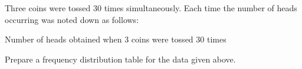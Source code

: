 Three coins were tossed 30 times simultaneously. Each time the number of heads occurring was noted down as follows:\\
\begin{table}[ht!]
\centering

\caption{Number of heads obtained when 3 coins were tossed 30 times}
\label{table:heads}
\end{table}
Prepare a frequency distribution table for the data given above.\\
